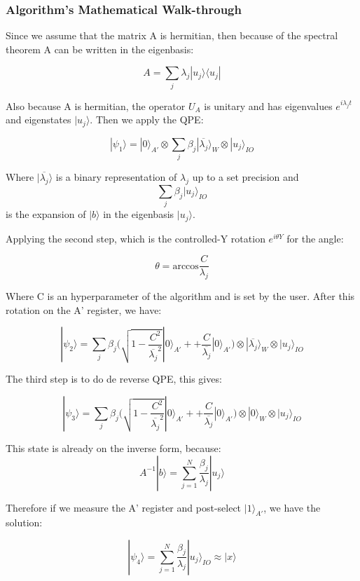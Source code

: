 \subsubsection{Algorithm's Mathematical Walk-through}
\label{Subsubsec: Walktrhough HHL}

Since we assume that the matrix A is hermitian, then because of the spectral theorem A can be written in the eigenbasis:

$$
A = \sum_j \lambda_j | u_j \rangle \langle u_j |
$$

Also because A is hermitian, the operator $U_A$ is unitary and has eigenvalues $e^{i \lambda_j t}$ and eigenstates $| u_j \rangle$. Then we apply the QPE:

$$
| \psi_1 \rangle = | 0 \rangle_{A'} \otimes \sum_j \beta_j | \overline{\lambda_j} \rangle_{W} \otimes | u_j \rangle_{IO}
$$

Where $| \overline{\lambda_j} \rangle$ is a binary representation of $\lambda_j$ up to a set precision and $$\sum_j \beta_j | u_j \rangle_{IO}$$ is the expansion of $| b \rangle$ in the eigenbasis $| u_j \rangle$. 

Applying the second step, which is the controlled-Y rotation $e^{i \theta Y}$ for the angle:

$$
\theta = \mathrm{arccos} \frac{C}{\lambda_j}
$$

Where C is an hyperparameter of the algorithm and is set by the user. After this rotation on the A' register, we have:

$$
| \psi_2 \rangle = \sum_j \beta_j \bigg( \sqrt{ 1 - \frac{C^2}{\overline{\lambda_j}^2}} | 0 \rangle_{A'} + + \frac{C}{\overline{\lambda_j}} | 0 \rangle_{A'} \bigg)\otimes | \overline{\lambda_j} \rangle_{W} \otimes | u_j \rangle_{IO}
$$

The third step is to do de reverse QPE, this gives:

$$
| \psi_3 \rangle = \sum_j \beta_j \bigg( \sqrt{ 1 - \frac{C^2}{\overline{\lambda_j}^2}} | 0 \rangle_{A'} + + \frac{C}{\overline{\lambda_j}} | 0 \rangle_{A'} \bigg)\otimes | 0 \rangle_{W} \otimes | u_j \rangle_{IO}
$$

This state is already on the inverse form, because: $$ A^{-1} | b \rangle = \sum_{j=1}^N \frac{\beta_j}{\lambda_j} | u_j \rangle$$

Therefore if we measure the A' register and post-select $| 1 \rangle_{A'}$, we have the solution:

$$
| \psi_4 \rangle = \sum_{j=1}^N \frac{\beta_j}{\lambda_j} | u_j \rangle_{IO} \approx | x \rangle
$$

